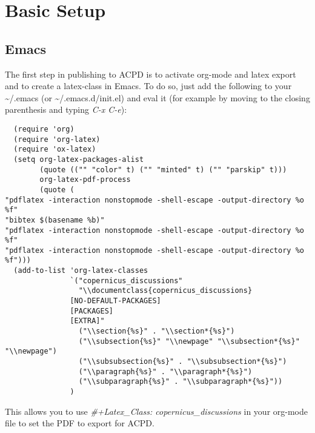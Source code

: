 \documentclass[11pt]{article}
\begin{document}
\section*{Basic Setup}
\label{sec-2}

\subsection*{Emacs}
\label{sec-2-1}

The first step in publishing to ACPD is to activate org-mode and latex export and to create a latex-class in Emacs. To do so, just add the following to your \textasciitilde{}/.emacs (or \textasciitilde{}/.emacs.d/init.el) and eval it (for example by moving to the closing parenthesis and typing \emph{C-x C-e}):

\begin{verbatim}
  (require 'org)
  (require 'org-latex)
  (require 'ox-latex)
  (setq org-latex-packages-alist 
        (quote (("" "color" t) ("" "minted" t) ("" "parskip" t)))
        org-latex-pdf-process 
        (quote (
"pdflatex -interaction nonstopmode -shell-escape -output-directory %o %f" 
"bibtex $(basename %b)" 
"pdflatex -interaction nonstopmode -shell-escape -output-directory %o %f" 
"pdflatex -interaction nonstopmode -shell-escape -output-directory %o %f")))
  (add-to-list 'org-latex-classes
               `("copernicus_discussions"
                 "\\documentclass{copernicus_discussions}
               [NO-DEFAULT-PACKAGES]
               [PACKAGES]
               [EXTRA]"
                 ("\\section{%s}" . "\\section*{%s}")
                 ("\\subsection{%s}" "\\newpage" "\\subsection*{%s}" "\\newpage")
                 ("\\subsubsection{%s}" . "\\subsubsection*{%s}")
                 ("\\paragraph{%s}" . "\\paragraph*{%s}")
                 ("\\subparagraph{%s}" . "\\subparagraph*{%s}"))
               )
\end{verbatim}


This allows you to use \emph{\#+Latex\_Class: copernicus\_discussions} in your org-mode file to set the PDF to export for ACPD.
\end{document}
